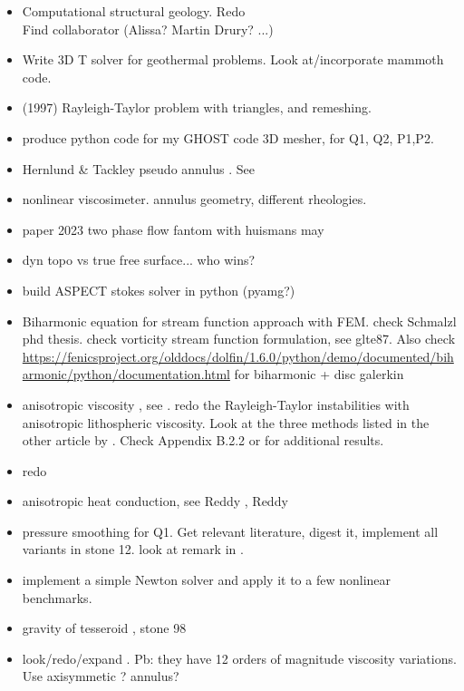 \documentclass[a4paper]{article}
\begin{document}
\begin{itemize}
\item Computational structural geology. Redo  \\
Find collaborator (Alissa? Martin Drury? ...)
\item Write 3D T solver for geothermal problems. Look at/incorporate
mammoth code.
\item \textcite{vaks97} (1997) Rayleigh-Taylor problem with triangles, and remeshing.
\item produce python code for my GHOST code \textcite{thie18} 3D mesher, for Q1, Q2, P1,P2.
\item Hernlund \& Tackley pseudo annulus . See \textcite{josv21}
\item nonlinear viscosimeter. annulus geometry, different rheologies.
\item paper 2023 two phase flow fantom with huismans may
\item dyn topo vs true free surface... who wins?
\item build ASPECT stokes solver in python (pyamg?)
\item Biharmonic equation for stream function approach with FEM. check Schmalzl phd thesis.
check vorticity stream function formulation, see glte87.
Also check \url{https://fenicsproject.org/olddocs/dolfin/1.6.0/python/demo/documented/biharmonic/python/documentation.html} for biharmonic + disc galerkin
\item anisotropic viscosity , see \textcite{leha08}.
redo the Rayleigh-Taylor instabilities with 
anisotropic lithospheric viscosity.
Look at the three methods listed in the other article by \textcite{leha08b}. 
Check Appendix B.2.2 or \textcite{perr19} for additional results.

\item redo 
\item anisotropic heat conduction, see  Reddy \cite[p121]{reddybook2}, Reddy \cite[p143]{reddybook2} 
\item pressure smoothing for Q1. Get relevant literature, digest it, implement all variants in stone 12.
look at remark in \textcite{lumh24}.

\item implement a simple Newton solver and apply it to a few nonlinear  benchmarks. 

\item gravity of tesseroid , stone 98
\item look/redo/expand . Pb: they have 12 orders of magnitude viscosity variations.
Use axisymmetic ? annulus?


\end{itemize}
\end{document}
